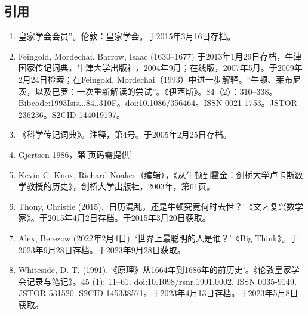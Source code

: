 \subsection{引用}  
\begin{enumerate}
\item 皇家学会会员”。伦敦：皇家学会。于2015年3月16日存档。  
\item Feingold, Mordechai. Barrow, Isaac (1630–1677) 于2013年1月29日存档，牛津国家传记词典，牛津大学出版社，2004年9月；在线版，2007年5月。于2009年2月24日检索；在Feingold, Mordechai（1993）中进一步解释。“牛顿、莱布尼茨，以及巴罗：一次重新解读的尝试”。《伊西斯》。84（2）：310–338。Bibcode:1993Isis...84..310F。doi:10.1086/356464。ISSN 0021-1753。JSTOR 236236。S2CID 144019197。
\item 《科学传记词典》。注释，第4号。于2005年2月25日存档。  
\item Gjertsen 1986，第[页码需提供]  
\item Kevin C. Knox, Richard Noakes（编辑），《从牛顿到霍金：剑桥大学卢卡斯数学教授的历史》，剑桥大学出版社，2003年，第61页。
\item Thony, Christie (2015). ‘日历混乱，还是牛顿究竟何时去世？’《文艺复兴数学家》。于2015年4月2日存档。于2015年3月20日获取。  
\item Alex, Berezow (2022年2月4日). ‘世界上最聪明的人是谁？’《Big Think》。于2023年9月28日存档。于2023年9月28日获取。  
\item Whiteside, D. T. (1991). ‘《原理》从1664年到1686年的前历史’。《伦敦皇家学会记录与笔记》。45 (1): 11–61. doi:10.1098/rsnr.1991.0002. ISSN 0035-9149. JSTOR 531520. S2CID 145338571。于2023年4月13日存档。于2023年5月8日获取。


\end{enumerate}
